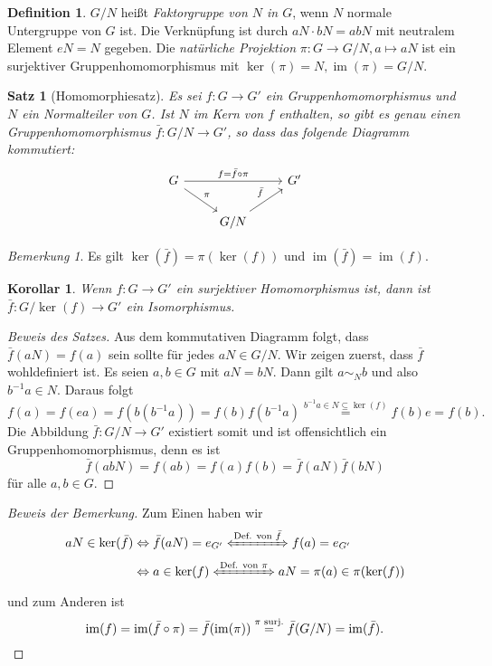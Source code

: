 \documentclass[12pt]{scrartcl} %
\DeclareMathOperator{\im}{im}
\newtheorem{thm}{Satz}
\newtheorem{kor}{Korollar}
\theoremstyle{definition}
\newtheorem*{defn}{Definition}
\theoremstyle{remark}
\newtheorem*{nb}{Bemerkung}
\begin{document}
\begin{defn}
	$G/N$ heißt \emph{Faktorgruppe von $N$ in $G$}, wenn $N$ normale Untergruppe von $G$ ist.
	Die Verknüpfung ist durch $aN \cdot bN = abN$ mit neutralem Element $eN = N$ gegeben.
	Die \emph{natürliche Projektion} $\pi : G \rightarrow G/N, a \mapsto aN$ ist ein surjektiver Gruppenhomomorphismus mit $\ker(\pi) = N, \im(\pi) = G/N$.
\end{defn}

\begin{thm}[Homomorphiesatz]
	Es sei $f: G \rightarrow G'$ ein Gruppenhomomorphismus und \(N\) ein Normalteiler von \(G\).
	Ist \(N\) im Kern von \(f\) enthalten, so gibt es genau einen Gruppenhomomorphismus $\bar{f}: G/N \rightarrow G'$, so dass das folgende Diagramm kommutiert:
	\[\begin{tikzcd}
		G \arrow[rd,"\pi"] \arrow[rr,"f=\bar f\circ \pi"] & & G'\\
		& G/N \arrow[ru,"\bar f"] &
	\end{tikzcd}\]
\end{thm}

\begin{nb}
	Es gilt $\ker(\bar{f}) = \pi(\ker(f))$ und $\im(\bar{f}) = \im(f)$. 
\end{nb}

\begin{kor}
	Wenn $f: G \rightarrow G'$ ein surjektiver Homomorphismus ist, dann ist $\bar{f}: G/\ker(f) \rightarrow G'$ ein Isomorphismus.
\end{kor}

\begin{proof}[Beweis des Satzes]
	Aus dem kommutativen Diagramm folgt, dass $\bar{f}(aN) = f(a)$ sein sollte für jedes $aN \in G/N$.
	Wir zeigen zuerst, dass $\bar{f}$ wohldefiniert ist.
	Es seien $a, b \in G$ mit $aN = bN$.
	Dann gilt $a \sim_{N} b$ und also $b^{-1}a \in N$.
	Daraus folgt $$f(a) = f(ea) = f(b(b^{-1}a)) = f(b) f(b^{-1}a) \stackrel{b^{-1}a \in N \subseteq \ker(f)}{=} f(b)e = f(b).$$
	Die Abbildung $\bar{f}: G/N \rightarrow G'$ existiert somit und ist offensichtlich ein Gruppenhomomorphismus, denn es ist
	$$\bar{f}(abN) = f(ab) = f(a)f(b) = \bar{f}(aN)\bar{f}(bN)$$ für alle $a, b \in G$.
\end{proof}

\begin{proof}[Beweis der Bemerkung]
	Zum Einen haben wir
	\begin{align*}
		aN \in \ker(\bar{f}) &\Leftrightarrow \bar f(aN) = e_{G'} \xLeftrightarrow{\text{Def. von \(\bar{f}\)}} f(a) = e_{G'}\\
		&\Leftrightarrow a \in \ker(f) \xLeftrightarrow{\text{Def. von \(\pi\)}} aN = \pi(a) \in \pi(\ker(f))
	\end{align*}
	und zum Anderen ist
	\[\im(f) = \im(\bar{f} \circ \pi) = \bar{f}(\im(\pi)) \stackrel{\text{\(\pi\) surj.}}{=} \bar{f}(G/N) = \im(\bar{f}).\qedhere\]
\end{proof}
\end{document}
